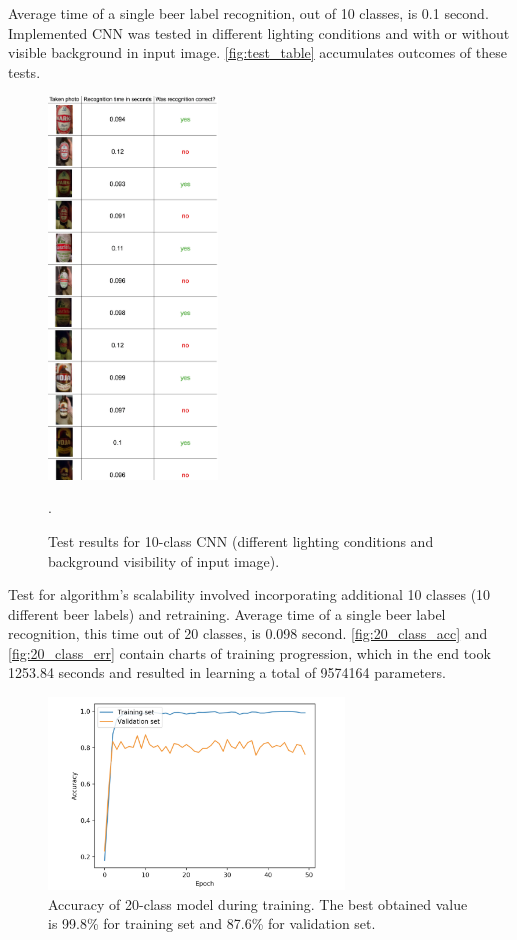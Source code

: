 \documentclass[11pt]{article}
\begin{document}
Average time of a single beer label recognition, out of 10 classes, is 0.1 second. Implemented CNN was tested in different lighting conditions and with or without visible background in input image. \autoref{fig:test_table} accumulates outcomes of these tests.\\

\begin{figure}[h]
\includegraphics[width=0.4\textwidth]{test_table}
\centering
\caption{Test results for 10-class CNN (different lighting conditions and background visibility of input image).}.
\label{fig:test_table}
\end{figure}

Test for algorithm's scalability involved incorporating additional 10 classes (10 different beer labels) and retraining. Average time of a single beer label recognition, this time out of 20 classes, is 0.098 second. \autoref{fig:20_class_acc} and \ref{fig:20_class_err} contain charts of training progression, which in the end took 1253.84 seconds and resulted in learning a total of 9574164 parameters.

\begin{figure}[h]
\includegraphics[width=0.7\textwidth]{20_class_acc}
\centering
\caption{Accuracy of 20-class model during training. The best obtained value is 99.8\% for training set and 87.6\% for validation set.}
\label{fig:20_class_acc}
\end{figure}
\end{document}
